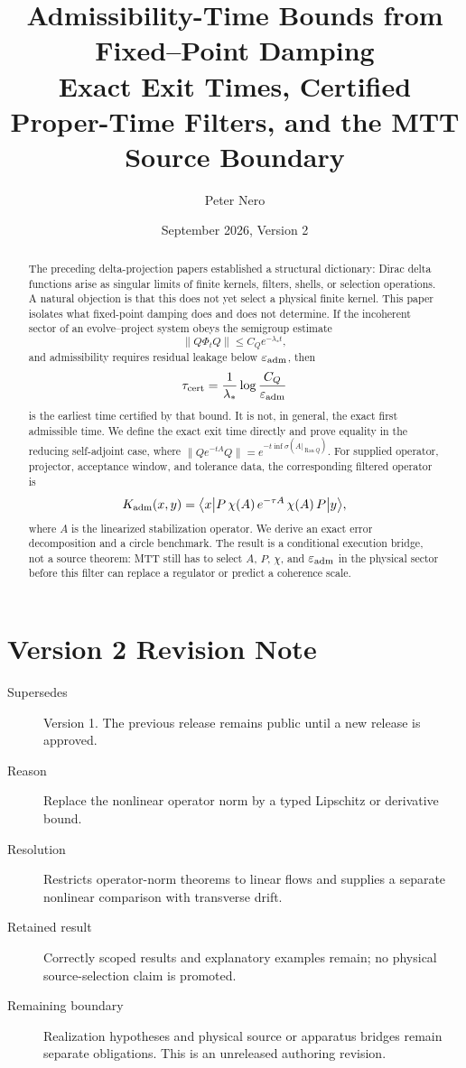 \documentclass[11pt]{article}
\title{Admissibility-Time Bounds from Fixed--Point Damping\\
\large Exact Exit Times, Certified Proper-Time Filters, and the MTT Source Boundary}
\author{Peter Nero}
\date{September 2026, Version 2}
\begin{document}
\maketitle

\begin{abstract}
The preceding delta-projection papers established a structural dictionary: Dirac delta functions arise as singular limits of finite kernels, filters, shells, or selection operations. A natural objection is that this does not yet select a physical finite kernel. This paper isolates what fixed-point damping does and does not determine. If the incoherent sector of an evolve--project system obeys the semigroup estimate
\[
\|Q\Phi_t Q\| \le C_Q e^{-\lambda_\ast t},
\]
and admissibility requires residual leakage below \(\varepsilon_{\rm adm}\), then
\[
\tau_{\rm cert}=\frac{1}{\lambda_\ast}\log\frac{C_Q}{\varepsilon_{\rm adm}}
\]
is the earliest time certified by that bound. It is not, in general, the exact first admissible time. We define the exact exit time directly and prove equality in the reducing self-adjoint case, where
\(\|Qe^{-tA}Q\|=e^{-t\inf\sigma(A|_{\operatorname{Ran}Q})}\).
For supplied operator, projector, acceptance window, and tolerance data, the corresponding filtered operator is
\[
K_{\rm adm}(x,y)
=
\big\langle x\big|P\,\chi(A)\,e^{-\tau A}\,\chi(A)\,P\big|y\big\rangle,
\]
where \(A\) is the linearized stabilization operator. We derive an exact error decomposition and a circle benchmark. The result is a conditional execution bridge, not a source theorem: MTT still has to select \(A\), \(P\), \(\chi\), and \(\varepsilon_{\rm adm}\) in the physical sector before this filter can replace a regulator or predict a coherence scale.
\end{abstract}

\section*{Version 2 Revision Note}
\begin{description}
\item[Supersedes] Version 1. The previous release remains public until a new release is approved.
\item[Reason] Replace the nonlinear operator norm by a typed Lipschitz or derivative bound.
\item[Resolution] Restricts operator-norm theorems to linear flows and supplies a separate nonlinear comparison with transverse drift.
\item[Retained result] Correctly scoped results and explanatory examples remain; no physical source-selection claim is promoted.
\item[Remaining boundary] Realization hypotheses and physical source or apparatus bridges remain separate obligations. This is an unreleased authoring revision.
\end{description}
\end{document}
